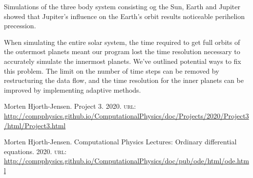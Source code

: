 \documentclass[a4paper,10pt,twocolumn]{article}
\begin{document}
Simulations of the three body system consisting og the Sun, Earth and Jupiter showed that Jupiter's influence on the Earth's orbit results noticeable perihelion precession. 

When simulating the entire solar system, the time required to get full orbits of the outermost planets meant our program lost the time resolution necessary to accurately simulate the innermost planets. We've outlined potential ways to fix this problem. The limit on the number of time steps can be removed by restructuring the data flow, and the time resolution for the inner planets can be improved by implementing adaptive methods.





\onecolumn
\begin{thebibliography}{9}

Morten Hjorth-Jensen. Project 3. 2020. \textsc{url: }\url{http://compphysics.github.io/ComputationalPhysics/doc/Projects/2020/Project3/html/Project3.html}

Morten Hjorth-Jensen. Computational Physics Lectures: Ordinary differential equations. 2020. \textsc{url: }\url{http://compphysics.github.io/ComputationalPhysics/doc/pub/ode/html/ode.html}


\end{thebibliography}



\end{document}
